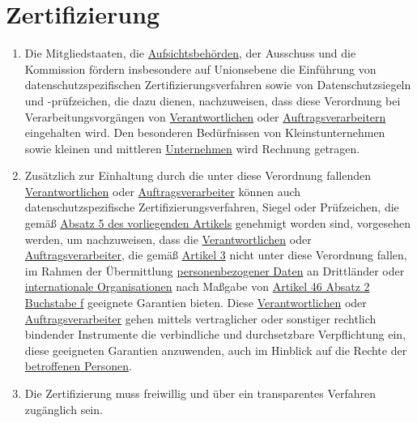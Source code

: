 \chapter{Zertifizierung}
\label{ch:42}


\begin{enumerate}

  \item Die Mitgliedstaaten, die \hyperref[itm:04-21]{Aufsichtsbehörden}, der Ausschuss und die Kommission fördern
   insbesondere auf Unionsebene die Einführung von datenschutzspezifischen Zertifizierungsverfahren sowie von
   Datenschutzsiegeln und -prüfzeichen, die dazu dienen, nachzuweisen, dass diese Verordnung bei Verarbeitungsvorgängen
   von
   \hyperref[itm:04-7]{Verantwortlichen} oder \hyperref[itm:04-8]{Auftragsverarbeitern} eingehalten wird. Den besonderen
    Bedürfnissen von Kleinstunternehmen sowie kleinen und mittleren \hyperref[itm:04-18]{Unternehmen} wird Rechnung
    getragen.
  \label{itm:42-1}

  \item Zusätzlich zur Einhaltung durch die unter diese Verordnung fallenden \hyperref[itm:04-7]
   {Verantwortlichen} oder \hyperref[itm:04-8]{Auftragsverarbeiter} können auch datenschutzspezifische
   Zertifizierungsverfahren, Siegel oder Prüfzeichen, die gemäß \hyperref[itm:42-5]{Absatz 5 des vorliegenden Artikels}
   genehmigt worden sind, vorgesehen werden, um nachzuweisen, dass die
   \hyperref[itm:04-7]{Verantwortlichen} oder \hyperref[itm:04-8]{Auftragsverarbeiter}, die gemäß \hyperref[ch:3]
    {Artikel 3} nicht unter diese Verordnung fallen, im Rahmen der Übermittlung \hyperref[itm:04-1]
    {personenbezogener Daten} an Drittländer oder \hyperref[itm:04-29]{internationale Organisationen} nach Maßgabe
    von \hyperref[itm:46-2f]{Artikel 46 Absatz 2 Buchstabe f} geeignete Garantien bieten. Diese \hyperref[itm:04-7]
    {Verantwortlichen} oder \hyperref[itm:04-8]{Auftragsverarbeiter} gehen mittels vertraglicher oder sonstiger
    rechtlich bindender Instrumente die verbindliche und durchsetzbare Verpflichtung ein, diese geeigneten Garantien
    anzuwenden, auch im Hinblick auf die Rechte der
   \hyperref[itm:04-1]{betroffenen Personen}.
  \label{itm:42-2}

  \item Die Zertifizierung muss freiwillig und über ein transparentes Verfahren zugänglich sein.
  \label{itm:42-3}


\end{enumerate}
